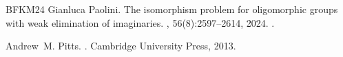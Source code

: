 \documentclass{lmcs}
\begin{document}
\begin{thebibliography}{BFKM24}
Gianluca Paolini.
\newblock The isomorphism problem for oligomorphic groups with weak elimination
  of imaginaries.
, 56(8):2597--2614,
  2024.
\newblock \href {https://doi.org/10.1112/blms.13086}
  {}.

Andrew~M. Pitts.
.
\newblock Cambridge University Press, 2013.

\end{thebibliography}
\end{document}
